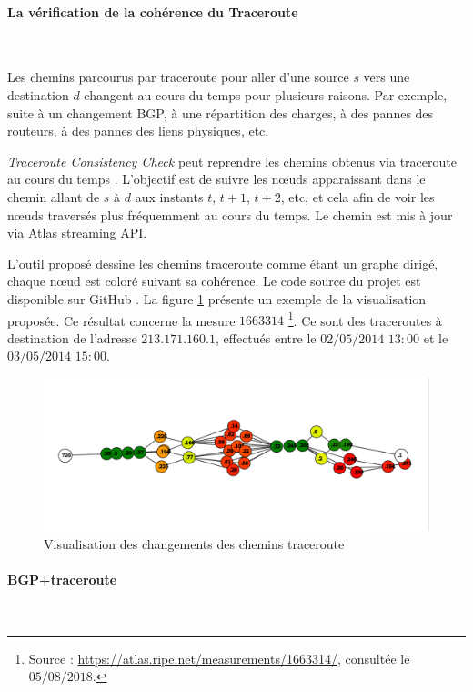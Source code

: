 \paragraph{La vérification de la cohérence du Traceroute}~

Les chemins parcourus par traceroute pour aller d'une source $s$ vers une destination $d$ changent au cours du temps pour plusieurs raisons. Par exemple, suite   à un changement BGP, à une  répartition des charges, à des pannes des routeurs,  à des pannes des liens physiques, etc.

\textit{Traceroute Consistency Check} peut reprendre les chemins obtenus via traceroute au cours du temps . L'objectif est de suivre les  n\oe{}uds apparaissant dans le chemin allant de  $s$ à $d$ aux instants $t$, $t+1$, $t+2$, etc, et cela afin de voir les n\oe{}uds traversés plus fréquemment au cours du temps. Le chemin est mis à jour via Atlas streaming API. 

L'outil proposé dessine les chemins traceroute comme étant un graphe dirigé, chaque n\oe{}ud est coloré suivant sa cohérence. Le code source du projet est disponible sur GitHub \cite{Traceroute-consistency-check}. La figure \ref{fig:Traceroute-consistency-check} présente un exemple de la visualisation proposée. Ce résultat concerne la mesure $1663314$ \footnote{Source : \url{https://atlas.ripe.net/measurements/1663314/}, consultée le $05/08/2018$.}. Ce sont des traceroutes à destination de l'adresse $213.171.160.1$, effectués entre le $02/05/2014$ $13:00$ et le $03/05/2014$ $15:00$.

\begin{figure}[H]
	\centering
	\includegraphics[width=1\linewidth]{illustrations/traceroute-consitance.png}
	\caption{Visualisation des changements des chemins traceroute \cite{Traceroute-consistency-check}}
	\label{fig:Traceroute-consistency-check}
\end{figure}

\paragraph{BGP+traceroute} ~

